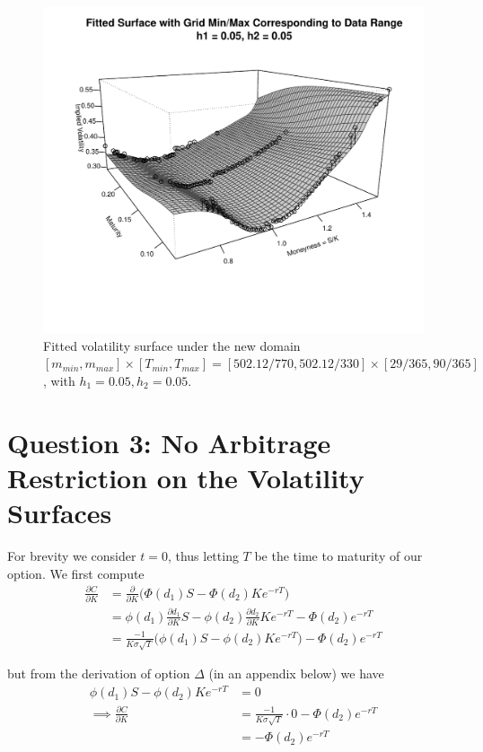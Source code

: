 \documentclass[11pt]{article}
\begin{document}
\begin{figure}[H]
	\centering
 	\includegraphics[scale=0.75]{../plots/q2/fitted_2d_new_grid.pdf}
\caption{Fitted volatility surface under the new domain $[m_{min}, m_{max}]\times[T_{min},T_{max}] = [502.12/770, 502.12/330]\times[29/365,90/365]$, with $h_1 = 0.05, h_2 = 0.05$.}
\label{fig:fitted_2d_new_grid}
\end{figure}

\section{Question 3: {\normalfont No Arbitrage Restriction on the Volatility Surfaces}}

For brevity we consider $t = 0$, thus letting $T$ be the time to maturity of our option. We first compute
\begin{align*}
	\frac{\partial C}{\partial K} &= \frac{\partial}{\partial K}\bigg( \Phi(d_1)S - \Phi(d_2)Ke^{-rT}\bigg) \\
	&= \phi(d_1)\frac{\partial d_1}{\partial K}S - \phi(d_2)\frac{\partial d_2}{\partial K}Ke^{-rT} - \Phi(d_2)e^{-rT} \\
	&= \frac{-1}{K\sigma\sqrt{T}}\bigg( \phi(d_1)S - \phi(d_2)Ke^{-rT} \bigg) - \Phi(d_2)e^{-rT}
\end{align*}

but from the derivation of option $\Delta$ (in an appendix below) we have
\begin{align*}
	\phi(d_1)S - \phi(d_2)Ke^{-rT} &= 0 \\
	\implies \frac{\partial C}{\partial K} &= \frac{-1}{K\sigma\sqrt{T}}\cdot0 - \Phi(d_2)e^{-rT} \\
	&= -\Phi(d_2)e^{-rT}
\end{align*}
\end{document}
